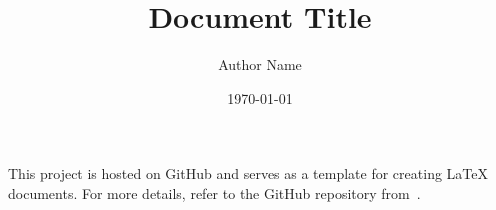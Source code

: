 \documentclass[twoside, 11pt]{article}
\title{Document Title}
\author{Author Name}
\date{\today}
\begin{document}
  \maketitle

  

  \setcounter{tocdepth}{2}
  \tableofcontents

  \newpage

  This project is hosted on GitHub and serves as a template for creating {\LaTeX} documents. 
  For more details, refer to the GitHub repository from~\cite{chang2025document}.

  
  \newpage
  
  \pagestyle{plain}
  \printbibliography{}
\end{document}

